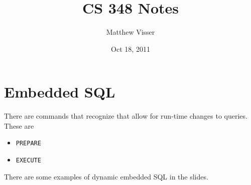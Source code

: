 \documentclass[12pt]{article}
\begin{document}
\title{CS 348 Notes}
\author{Matthew Visser}
\date{Oct 18, 2011}
\maketitle

\section{Embedded SQL}

There are commands that recognize that allow for run-time changes to queries.
These are
\begin{itemize}
	\item \texttt{PREPARE}
	\item \texttt{EXECUTE}
\end{itemize}

There are some examples of dynamic embedded SQL in the slides.
\end{document}
